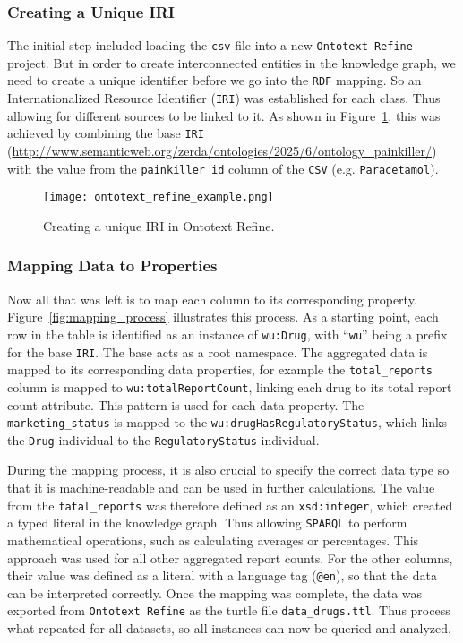 \subsubsection*{Creating a Unique IRI}
The initial step included loading the \texttt{csv} file into a new \texttt{Ontotext Refine} project. But in order to create interconnected entities in the knowledge graph, we need to create a unique identifier before we go into the \texttt{RDF} mapping. So an Internationalized Resource Identifier (\texttt{IRI}) was established for each class. Thus allowing for different sources to be linked to it. As shown in Figure~\ref{fig:iri_creation}, this was achieved by combining the base \texttt{IRI} (\url{http://www.semanticweb.org/zerda/ontologies/2025/6/ontology_painkiller/}) with the value from the \texttt{painkiller\_id} column of the \texttt{CSV} (e.g. \texttt{Paracetamol}).

\begin{figure}[H]
\centering
\texttt{[image: ontotext\_refine\_example.png]} %
\caption{Creating a unique IRI in Ontotext Refine.}
\label{fig:iri_creation}
\end{figure}

\subsubsection*{Mapping Data to Properties}
Now all that was left is to map each column to its corresponding property. Figure~\ref{fig:mapping_process} illustrates this process. As a starting point, each row in the table is identified as an instance of \texttt{wu:Drug}, with “\texttt{wu}” being a prefix for the base \texttt{IRI}. The base acts as a root namespace. The aggregated data is mapped to its corresponding data properties, for example the \texttt{total\_reports} column is mapped to \texttt{wu:total\-Report\-Count}, linking each drug to its total report count attribute. This pattern is used for each data property. The \texttt{marketing\_status} is mapped to the \texttt{wu:drug\-Has\-Regulatory\-Status}, which links the \texttt{Drug} individual to the \texttt{Regulatory\-Status} individual.

During the mapping process, it is also crucial to specify the correct data type so that it is machine-readable and can be used in further calculations. The value from the \texttt{fatal\_reports} was therefore defined as an \texttt{xsd:integer}, which created a typed literal in the knowledge graph. Thus allowing \texttt{SPARQL} to perform mathematical operations, such as calculating averages or percentages. This approach was used for all other aggregated report counts. For the other columns, their value was defined as a literal with a language tag (\texttt{@en}),  so that the data can be interpreted correctly.
Once the mapping was complete, the data was exported from \texttt{Ontotext Refine} as the turtle file \nolinkurl{data_drugs.ttl}. Thus process what repeated for all datasets, so all instances can now be queried and analyzed.


